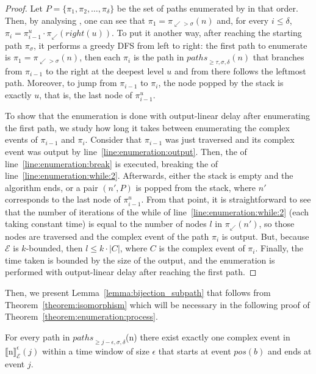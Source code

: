 \begin{proof}
  Let $P = \{\pi_{1}, \pi_{2}, \ldots, \pi_{\delta}\}$ be the set of paths enumerated by  in that order. Then, by analysing , one can see that $\pi_{1} = \pi_{\swarrow > \sigma}(n)$ and, for every $i \le \delta$, $\pi_{i} = \pi^{u}_{i-1} \cdot \pi_{\swarrow}(right(u))$. To put it another way, after reaching the starting path $\pi_{\sigma}$, it performs a greedy DFS from left to right: the first path to enumerate is $\pi_{1} = \pi_{\swarrow > \sigma}(n)$, then each $\pi_{i}$ is the path in ${paths}_{\ge \tau, \sigma, \delta}(n)$ that branches from $\pi_{i-1}$ to the right at the deepest level $u$ and from there follows the leftmost path. Moreover, to jump from $\pi_{i-1}$ to $\pi_{i}$, the node popped by the stack is exactly $u$, that is, the last node of $\pi^{u}_{i-1}$.

  To show that the enumeration is done with output-linear delay after enumerating the first path, we study how long it takes between enumerating the complex events of $\pi_{i-1}$ and $\pi_{i}$. Consider that $\pi_{i-1}$ was just traversed and its complex event was output by line~\ref{line:enumeration:output}. Then, the  of line~\ref{line:enumeration:break} is executed, breaking the  of line~\ref{line:enumeration:while:2}. Afterwards, either the stack is empty and the algorithm ends, or a pair $(n', P)$ is popped from the stack, where $n'$ corresponds to the last node of $\pi^{u}_{i-1}$. From that point, it is straightforward to see that the number of iterations of the while of line~\ref{line:enumeration:while:2} (each taking constant time) is equal to the number of nodes $l$ in $\pi_{\swarrow}(n')$, so those nodes are traversed and the complex event of the path $\pi_{i}$ is output. But, because $\mathcal{E}$ is $k$-bounded, then $l \le k \cdot |C|$, where $C$ is the complex event of $\pi_{i}$. Finally, the time taken is bounded by the size of the output, and the enumeration is performed with output-linear delay after reaching the first path.
\end{proof}

Then, we present Lemma~\ref{lemma:bijection_subpath} that follows from Theorem~\ref{theorem:isomorphism} which will be necessary in the following proof of Theorem~\ref{theorem:enumeration:process}.

\begin{lemma}\label{lemma:bijection_subpath}
  For every path in ${paths}_{\ge j-\epsilon, \sigma, \delta}$(n) there exist exactly one complex event in ${\llbracket \text{n} \rrbracket}^{\epsilon}_{\mathcal{E}}(j)$ within a time window of size $\epsilon$ that starts at event $pos(b)$ and ends at event $j$.
\end{lemma}

